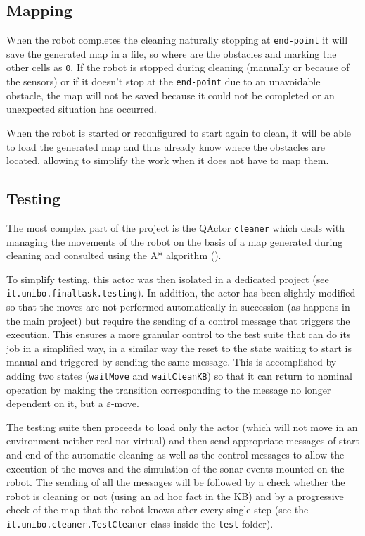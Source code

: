\subsection{Mapping}
When the robot completes the cleaning naturally stopping at \texttt{end-point} it will save the generated map in a file, so where are the obstacles and marking the other cells as \texttt{0}. If the robot is stopped during cleaning (manually or because of the sensors) or if it doesn't stop at the \texttt{end-point} due to an unavoidable obstacle, the map will not be saved because it could not be completed or an unexpected situation has occurred.

When the robot is started or reconfigured to start again to clean, it will be able to load the generated map and thus already know where the obstacles are located, allowing to simplify the work when it does not have to map them.

\subsection{Testing}
The most complex part of the project is the QActor \texttt{cleaner} which deals with managing the movements of the robot on the basis of a map generated during cleaning and consulted using the A* algorithm ().

To simplify testing, this actor was then isolated in a dedicated project (see \texttt{it.unibo.finaltask.testing}). In addition, the actor has been slightly modified so that the moves are not performed automatically in succession (as happens in the main project) but require the sending of a control message that triggers the execution. This ensures a more granular control to the test suite that can do its job in a simplified way, in a similar way the reset to the state waiting to start is manual and triggered by sending the same message. This is accomplished by adding two states (\texttt{waitMove} and \texttt{waitCleanKB}) so that it can return to nominal operation by making the transition corresponding to the message no longer dependent on it, but a $\varepsilon$-move.

The testing suite then proceeds to load only the actor (which will not move in an environment neither real nor virtual) and then send appropriate messages of start and end of the automatic cleaning as well as the control messages to allow the execution of the moves and the simulation of the sonar events mounted on the robot. The sending of all the messages will be followed by a check whether the robot is cleaning or not (using an ad hoc fact in the KB) and by a progressive check of the map that the robot knows after every single step (see the \texttt{it.unibo.cleaner.TestCleaner} class inside the \texttt{test} folder).

